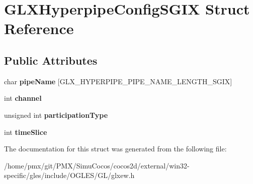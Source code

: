 \hypertarget{structGLXHyperpipeConfigSGIX}{}\section{G\+L\+X\+Hyperpipe\+Config\+S\+G\+IX Struct Reference}
\label{structGLXHyperpipeConfigSGIX}
\subsection*{Public Attributes}
\begin{DoxyCompactItemize}
\item 
\mbox{\label{structGLXHyperpipeConfigSGIX_a35b03a5796f020067d0f463aa32a7c2d}} 
char {\bfseries pipe\+Name} \mbox{[}G\+L\+X\+\_\+\+H\+Y\+P\+E\+R\+P\+I\+P\+E\+\_\+\+P\+I\+P\+E\+\_\+\+N\+A\+M\+E\+\_\+\+L\+E\+N\+G\+T\+H\+\_\+\+S\+G\+IX\mbox{]}
\item 
\mbox{\label{structGLXHyperpipeConfigSGIX_abc812d8796ba89d5de4e33b3532d8335}} 
int {\bfseries channel}
\item 
\mbox{\label{structGLXHyperpipeConfigSGIX_a093cfaaec305531f66e1120929b5b01b}} 
unsigned int {\bfseries participation\+Type}
\item 
\mbox{\label{structGLXHyperpipeConfigSGIX_afe9288e75dc1ae5e0f33eff978d7024d}} 
int {\bfseries time\+Slice}
\end{DoxyCompactItemize}


The documentation for this struct was generated from the following file\+:\begin{DoxyCompactItemize}
\item 
/home/pmx/git/\+P\+M\+X/\+Simu\+Cocos/cocos2d/external/win32-\/specific/gles/include/\+O\+G\+L\+E\+S/\+G\+L/glxew.\+h\end{DoxyCompactItemize}
